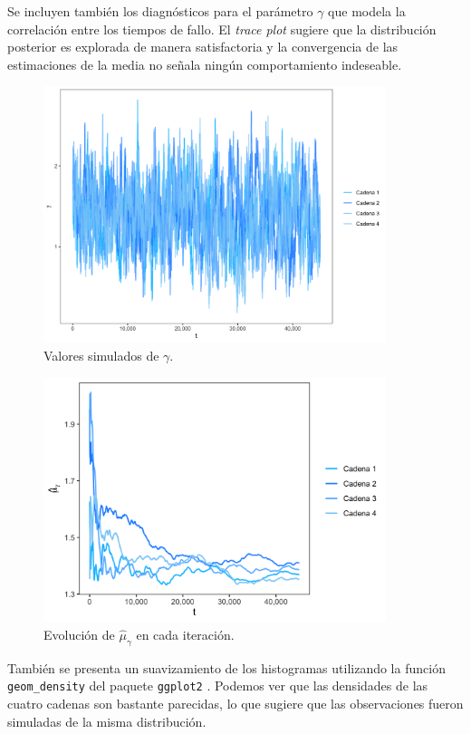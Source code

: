 \documentclass[11pt,a4paper]{article}
\begin{document}
Se incluyen también los diagnósticos para el parámetro $\gamma$ que modela la correlación entre los tiempos de fallo. El \textit{trace plot} sugiere que la distribución posterior es explorada de manera satisfactoria y la convergencia de las estimaciones de la media no señala ningún comportamiento indeseable.\\

\begin{figure}
\centering\includegraphics[width=10cm]{gamma_traceplot.png}
\caption{Valores simulados de $\gamma$.}
\label{fig:gamma_trace}
\end{figure}

\begin{figure}
\centering\includegraphics[width=10cm]{gamma_ergodic_means.png}
\caption{Evolución de $\hat{\mu}_{\gamma}$ en cada iteración.}
\label{fig:gamma_means}
\end{figure}

También se presenta un suavizamiento de los histogramas utilizando la función \texttt{geom\_density} del paquete \texttt{ggplot2} \citep{ggplot}. Podemos ver que las densidades de las cuatro cadenas son bastante parecidas, lo que sugiere que las observaciones fueron simuladas de la misma distribución.\\
\end{document}
